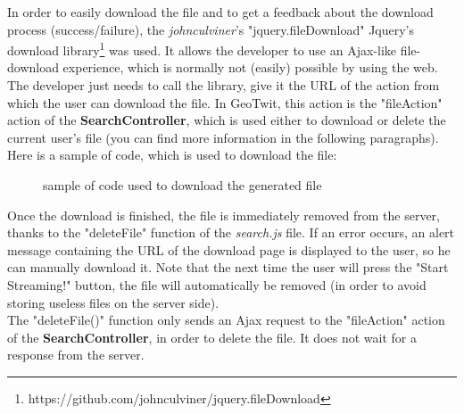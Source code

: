 \documentclass[a4paper,11pt]{report}
\begin{document}
In order to easily download the file and to get a feedback about the download process (success/failure), the \emph{johnculviner}'s "jquery.fileDownload" Jquery's download library\footnote{https://github.com/johnculviner/jquery.fileDownload} was used. It allows the developer to use an Ajax-like file-download experience, which is normally not (easily) possible by using the web.\\
The developer just needs to call the library, give it the URL of the action from which the user can download the file. In GeoTwit, this action is the "fileAction" action of the \textbf{SearchController}, which is used either to download or delete the current user's file (you can find more information in the following paragraphs). Here is a sample of code, which is used to download the file:
\begin{figure}[H]
\vspace{-5pt}
\begin{center}
\vspace{-5pt}
\caption{sample of code used to download the generated file}
\end{center}
\end{figure}

Once the download is finished, the file is immediately removed from the server, thanks to the "deleteFile" function of the \emph{search.js} file. If an error occurs, an alert message containing the URL of the download page is displayed to the user, so he can manually download it. Note that the next time the user will press the "Start Streaming!" button, the file will automatically be removed (in order to avoid storing useless files on the server side).\\

The "deleteFile()" function only sends an Ajax request to the "fileAction" action of the \textbf{SearchController}, in order to delete the file. It does not wait for a response from the server.\\
\end{document}
